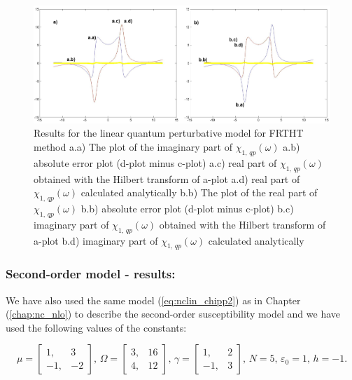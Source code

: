 \documentclass[12pt,twoside,a4paper]{article}
\numberwithin{equation}{subsection}
\numberwithin{figure}{subsection}
\begin{document}
\begin{figure}
  \includegraphics[width=150mm]{img/fht_qp1.png}
  \caption{Results for the linear quantum perturbative model for FRTHT method
    a.a) The plot of the imaginary part of ${\chi_{1, \,qp}}(\omega )$
    a.b) absolute error plot (d-plot minus c-plot) 
    a.c) real part of $\chi_{1, \, qp} (\omega )$ obtained with the Hilbert transform of a-plot 
    a.d) real part of $\chi_{1, \, qp} (\omega )$ calculated analytically 
    b.b) The plot of the real part of $ \chi_{1, \, qp} (\omega )$ 
    b.b) absolute error plot (d-plot minus c-plot) 
    b.c) imaginary part of $\chi_{1, \, qp} (\omega )$ obtained with the Hilbert transform of a-plot 
    b.d) imaginary part of $\chi_{1, \, qp} (\omega )$ calculated analytically  
    \label{fig:fht_qp1}
  }
\end{figure}

\subsubsection*{Second-order model - results:}

We have also used the same model (\ref{eq:nclin_chipp2}) as in Chapter (\ref{chap:nc_nlo}) to describe the second-order susceptibility
model and we have used the following values of the constants: 

\begin{equation}
	\mu = \begin{bmatrix} 
    	1, & 3 \\ -1, & -2 
  	\end{bmatrix} , \, 
  	\Omega =  \begin{bmatrix}  
    	3, & 16 \\ 4, & 12 
  	\end{bmatrix} , \,
  	\gamma =  \begin{bmatrix}  
  		1, & 2 \\ -1, & 3
  	\end{bmatrix} , \, 
  	N = 5 , \, 
  	\varepsilon_0 = 1, \,
  	h = - 1 .
\end{equation}
\end{document}
